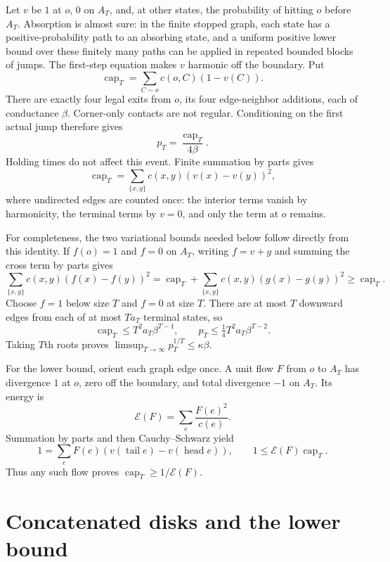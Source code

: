 \documentclass[11pt]{article}
\newcommand{\capT}{\operatorname{cap}_T}
\begin{document}
Let $v$ be $1$ at $o$, $0$ on $A_T$, and, at other states, the probability
of hitting $o$ before $A_T$. Absorption is almost sure: in the finite
stopped graph, each state has a positive-probability path to an absorbing
state, and a uniform positive lower bound over these finitely many paths
can be applied in repeated bounded blocks of jumps. The first-step
equation makes $v$ harmonic off the boundary. Put
\[
 \capT=\sum_{C\sim o}c(o,C)(1-v(C)).
\]
There are exactly four legal exits from $o$, its four edge-neighbor
additions, each of conductance $\beta$. Corner-only contacts are not
regular. Conditioning on the first actual jump therefore gives
\begin{equation}\label{eq:escape}
 p_T=\frac{\capT}{4\beta}.
\end{equation}
Holding times do not affect this event. Finite summation by parts gives
\begin{equation}\label{eq:voltage-energy}
 \capT=\sum_{\{x,y\}}c(x,y)(v(x)-v(y))^2,
\end{equation}
where undirected edges are counted once: the interior terms vanish by
harmonicity, the terminal terms by $v=0$, and only the term at $o$ remains.

For completeness, the two variational bounds needed below follow directly
from this identity. If $f(o)=1$ and $f=0$ on $A_T$, writing $f=v+g$ and
summing the cross term by parts gives
\[
 \sum_{\{x,y\}}c(x,y)(f(x)-f(y))^2
 =\capT+\sum_{\{x,y\}}c(x,y)(g(x)-g(y))^2\ge\capT.
\]
Choose $f=1$ below size $T$ and $f=0$ at size $T$. There are at most
$T$ downward edges from each of at most $Ta_T$ terminal states, so
\begin{equation}\label{eq:upper}
 \capT\le T^2a_T\beta^{T-1},\qquad
 p_T\le\tfrac14 T^2a_T\beta^{T-2}.
\end{equation}
Taking $T$th roots proves
$\limsup_{T\to\infty}p_T^{1/T}\le\kappa\beta$.

For the lower bound, orient each graph edge once. A unit flow $F$ from
$o$ to $A_T$ has divergence $1$ at $o$, zero off the boundary, and total
divergence $-1$ on $A_T$. Its energy is
\[
 \mathcal E(F)=\sum_e\frac{F(e)^2}{c(e)}.
\]
Summation by parts and then Cauchy--Schwarz yield
\[
 1=\sum_e F(e)(v(\operatorname{tail}e)-v(\operatorname{head}e)),
 \qquad 1\le\mathcal E(F)\capT.
\]
Thus any such flow proves $\capT\ge1/\mathcal E(F)$.

\section{Concatenated disks and the lower bound}
\end{document}

